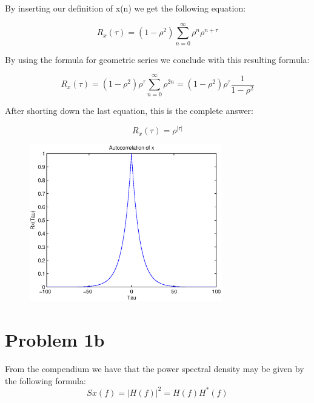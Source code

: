 	By inserting our definition of x(n) we get the following equation:
	
	\begin{equation*}
		R_x(\tau)=(1-\rho ^2)\sum_{n=0}^{\infty}\rho ^n\rho^{n+\tau}
	\end{equation*}
	
	By using the formula for geometric series we conclude with this resulting formula:
	
	\begin{equation*}
		R_x(\tau)=(1-\rho ^2)\rho^{\tau }\sum_{n=0}^{\infty}\rho^{2n}=(1-\rho ^2)\rho^{\tau }\frac{1}{1-\rho ^2}
	\end{equation*}
	
	After shorting down the last equation, this is the complete answer:
	
	\begin{equation}
		R_x(\tau)=\rho^{|\tau |}
	\end{equation}
	
	
	
	\begin{figure}[H]
	  \centering
	  \includegraphics[width=0.75\textwidth]{img/Oppgave1a}
	\end{figure}
	
  
  
  \section{Problem 1b}
	From the compendium we have that the power spectral density may be given by the following formula:
	\begin{equation}
		Sx(f)=|H(f)|^2=H(f)H^*(f)
	\end{equation}
	
